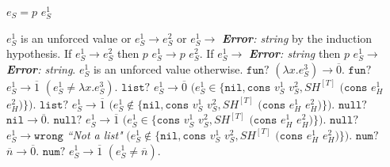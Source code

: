 \begin{case}

$e_{S}=p$ $e_{S}^{1}$

$e_{S}^{1}$ is an unforced value or $e_{S}^{1}\rightarrow e_{S}^{2}$ or $e_{S}^{1}\rightarrow$ \emph{\textbf{Error}: string} by the induction hypothesis.  If $e_{S}^{1}\rightarrow e_{S}^{2}$ then $p$ $e_{S}^{1}\rightarrow p$ $e_{S}^{2}$.  If $e_{S}^{1}\rightarrow$ \emph{\textbf{Error}: string} then $p$ $e_{S}^{1}\rightarrow$ \emph{\textbf{Error}: string}.  $e_{S}^{1}$ is an unforced value otherwise.  $\mathtt{fun?}$ $(\lambda x.e_{S}^{3})\rightarrow\overline{0}$.  $\mathtt{fun?}$ $e_{S}^{1}\rightarrow\overline{1}$ $(e_{S}^{1}\neq\lambda x.e_{S}^{3})$.  $\mathtt{list?}$ $e_{S}^{1}\rightarrow\overline{0}$ $(e_{S}^{1}\in\lbrace\mathtt{nil},\mathtt{cons}$ $v_{S}^{1}$ $v_{S}^{2},SH^{[T]}$ $(\mathtt{cons}$ $e_{H}^{1}$ $e_{H}^{2})\rbrace)$.  $\mathtt{list?}$ $e_{S}^{1}\rightarrow\overline{1}$ $(e_{S}^{1}\not\in\lbrace\mathtt{nil},\mathtt{cons}$ $v_{S}^{1}$ $v_{S}^{2},SH^{[T]}$ $(\mathtt{cons}$ $e_{H}^{1}$ $e_{H}^{2})\rbrace)$.  $\mathtt{null?}$ $\mathtt{nil}\rightarrow\overline{0}$.  $\mathtt{null?}$ $e_{S}^{1}\rightarrow\overline{1}$ $(e_{S}^{1}\in\lbrace\mathtt{cons}$ $v_{S}^{1}$ $v_{S}^{2},SH^{[T]}$ $(\mathtt{cons}$ $e_{H}^{1}$ $e_{H}^{2})\rbrace)$.  $\mathtt{null?}$ $e_{S}^{1}\rightarrow\mathtt{wrong}$ \emph{``Not a list"} $(e_{S}^{1}\not\in\lbrace\mathtt{nil},\mathtt{cons}$ $v_{S}^{1}$ $v_{S}^{2},SH^{[T]}$ $(\mathtt{cons}$ $e_{H}^{1}$ $e_{H}^{2})\rbrace)$.  $\mathtt{num?}$ $\overline{n}\rightarrow\overline{0}$.  $\mathtt{num?}$ $e_{S}^{1}\rightarrow\overline{1}$ $(e_{S}^{1}\neq\overline{n})$.

\end{case}